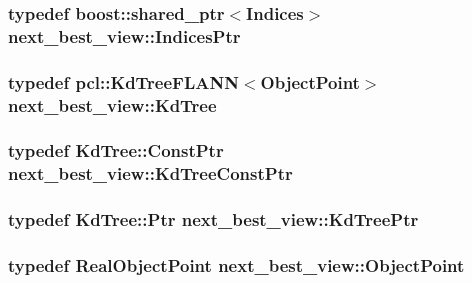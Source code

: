 \hypertarget{namespacenext__best__view_a89edd5f370254b5c7689adfede9fe6a7}{
\subsubsection[{\-Indices\-Ptr}]{\setlength{\rightskip}{0pt plus 5cm}typedef boost\-::shared\-\_\-ptr$<${\bf \-Indices}$>$ {\bf next\-\_\-best\-\_\-view\-::\-Indices\-Ptr}}}\label{namespacenext__best__view_a89edd5f370254b5c7689adfede9fe6a7}
\hypertarget{namespacenext__best__view_aecdb1ccea5275c5dc31783d031d38d26}{
\subsubsection[{\-Kd\-Tree}]{\setlength{\rightskip}{0pt plus 5cm}typedef pcl\-::\-Kd\-Tree\-F\-L\-A\-N\-N$<${\bf \-Object\-Point}$>$ {\bf next\-\_\-best\-\_\-view\-::\-Kd\-Tree}}}\label{namespacenext__best__view_aecdb1ccea5275c5dc31783d031d38d26}
\hypertarget{namespacenext__best__view_a9f78a5f1d066677e7ff7993ae14b857b}{
\subsubsection[{\-Kd\-Tree\-Const\-Ptr}]{\setlength{\rightskip}{0pt plus 5cm}typedef \-Kd\-Tree\-::\-Const\-Ptr {\bf next\-\_\-best\-\_\-view\-::\-Kd\-Tree\-Const\-Ptr}}}\label{namespacenext__best__view_a9f78a5f1d066677e7ff7993ae14b857b}
\hypertarget{namespacenext__best__view_aab5cd60b86a4a57ae8c69c2e2570679f}{
\subsubsection[{\-Kd\-Tree\-Ptr}]{\setlength{\rightskip}{0pt plus 5cm}typedef \-Kd\-Tree\-::\-Ptr {\bf next\-\_\-best\-\_\-view\-::\-Kd\-Tree\-Ptr}}}\label{namespacenext__best__view_aab5cd60b86a4a57ae8c69c2e2570679f}
\hypertarget{namespacenext__best__view_aa3f3b5e178ddd208eb1d973e44c1fc70}{
\subsubsection[{\-Object\-Point}]{\setlength{\rightskip}{0pt plus 5cm}typedef {\bf \-Real\-Object\-Point} {\bf next\-\_\-best\-\_\-view\-::\-Object\-Point}}}\label{namespacenext__best__view_aa3f3b5e178ddd208eb1d973e44c1fc70}
